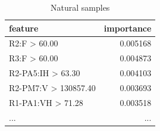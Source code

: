 \begin{table}[H]
\begin{subtable}[b]{0.5\linewidth}
        \centering\vspace*{.5cm}
        \caption{Natural samples} 
        \begin{tabular}{lr}\toprule
            feature                & importance   \\\midrule    
            R2:F > 60.00           &  0.005168 \\
            R3:F > 60.00           &  0.004873 \\
            R2-PA5:IH > 63.30      &  0.004103 \\
            R2-PM7:V > 130857.40   &  0.003693 \\
            R1-PA1:VH > 71.28     &   0.003518 \\
            ...                    &       ...    \\\bottomrule
        \end{tabular}
    \end{subtable}
\end{table}

